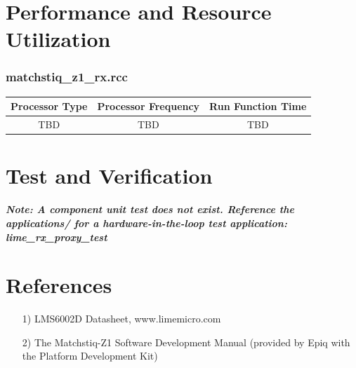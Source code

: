 \documentclass{article}
\def\comp{matchstiq\_z1\_rx}
\begin{document}
\section*{Performance and Resource Utilization}
\subsubsection*{\comp.rcc}
\begin{scriptsize}
	\begin{tabular}{|c|c|c|}
		\hline
		\rowcolor{blue}
		Processor Type & Processor Frequency & Run Function Time \\
		\hline
		TBD            & TBD                 & TBD               \\
		\hline
	\end{tabular}
\end{scriptsize}

\section*{Test and Verification}

\textit{\textbf{Note: A component unit test does not exist.  Reference the applications/ for a hardware-in-the-loop test application: lime\_rx\_proxy\_test}}

\section*{References}
\begin{itemize}
	\item[1)] LMS6002D Datasheet, www.limemicro.com
	\item[2)] The Matchstiq-Z1 Software Development Manual (provided by Epiq with the Platform Development Kit)
\end{itemize}
\end{document}
